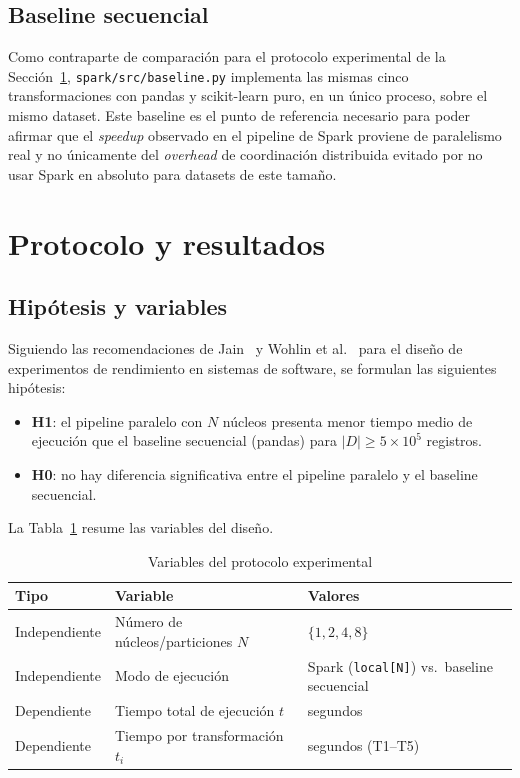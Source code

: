 \documentclass[11pt,letterpaper]{article}
\begin{document}
\subsection{Baseline secuencial}

Como contraparte de comparación para el protocolo experimental de la
Sección~\ref{sec:protocolo-resultados}, \texttt{spark/src/baseline.py} implementa las mismas cinco
transformaciones con pandas y scikit-learn puro, en un único proceso, sobre el mismo dataset. Este
baseline es el punto de referencia necesario para poder afirmar que el \emph{speedup} observado en
el pipeline de Spark proviene de paralelismo real y no únicamente del \emph{overhead} de
coordinación distribuida evitado por no usar Spark en absoluto para datasets de este tamaño.

\section{Protocolo y resultados}
\label{sec:protocolo-resultados}

\subsection{Hipótesis y variables}

Siguiendo las recomendaciones de Jain~\cite{jain1991art} y Wohlin et al.~\cite{wohlin2012experimentation}
para el diseño de experimentos de rendimiento en sistemas de software, se formulan las siguientes
hipótesis:

\begin{itemize}[leftmargin=1.5em]
    \item \textbf{H1}: el pipeline paralelo con $N$ núcleos presenta menor tiempo medio de
        ejecución que el baseline secuencial (pandas) para $|D| \geq 5 \times 10^5$ registros.
    \item \textbf{H0}: no hay diferencia significativa entre el pipeline paralelo y el baseline
        secuencial.
\end{itemize}

La Tabla~\ref{tab:variables-experimento} resume las variables del diseño.

\begin{table}[H]
\centering
\caption{Variables del protocolo experimental}
\label{tab:variables-experimento}
\begin{tabular}{@{}lll@{}}
\toprule
\textbf{Tipo} & \textbf{Variable} & \textbf{Valores} \\
\midrule
Independiente & Número de núcleos/particiones $N$ & $\{1, 2, 4, 8\}$ \\
Independiente & Modo de ejecución & Spark (\texttt{local[N]}) vs.\ baseline secuencial \\
Dependiente & Tiempo total de ejecución $t$ & segundos \\
Dependiente & Tiempo por transformación $t_i$ & segundos (T1--T5) \\
\bottomrule
\end{tabular}
\end{table}
\end{document}
